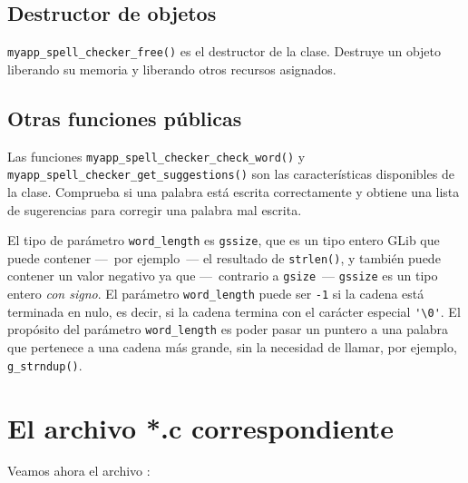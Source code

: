 
\subsection{Destructor de objetos}
\lstinline{myapp_spell_checker_free()} es el destructor de la clase. Destruye un objeto liberando su memoria y liberando otros recursos asignados.

\subsection{Otras funciones públicas}
Las funciones \lstinline{myapp_spell_checker_check_word()} y \lstinline{myapp_spell_checker_get_suggestions()} son las características disponibles de la clase. Comprueba si una palabra está escrita correctamente y obtiene una lista de sugerencias para corregir una palabra mal escrita.

El tipo de parámetro \lstinline{word_length} es \lstinline{gssize}, que es un tipo entero GLib que puede contener ---~por ejemplo~--- el resultado de \lstinline{strlen()}, y también puede contener un valor negativo ya que ---~contrario a \lstinline{gsize}~--- \lstinline {gssize} es un tipo entero \emph{con signo}. El parámetro \lstinline{word_length} puede ser \lstinline{-1} si la cadena está terminada en nulo, es decir, si la cadena termina con el carácter especial \lstinline{'\0'}. El propósito del parámetro \lstinline{word_length} es poder pasar un puntero a una palabra que pertenece a una cadena más grande, sin la necesidad de llamar, por ejemplo, \lstinline{g_strndup()}.

\section{El archivo *.c correspondiente}

Veamos ahora el archivo :

\vspace{0.7cm}


